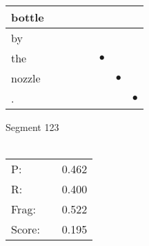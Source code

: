 \documentclass[landscape]{article}
\newcommand{\ssp}{\hspace{2pt}}
\newcommand{\mex}{\cellcolor{g}$\bullet$}
\begin{document}
\begin{tabular}{|l|p{10pt}|p{10pt}|p{10pt}|p{10pt}|p{10pt}|p{10pt}|p{10pt}|}
\hline
\ssp bottle \ssp&\hspace{2pt}&\hspace{2pt}&\hspace{2pt}&\hspace{2pt}&\hspace{2pt}&\hspace{2pt}&\hspace{2pt}\\
\hline
\ssp by \ssp&\hspace{2pt}&\hspace{2pt}&\hspace{2pt}&\hspace{2pt}&\hspace{2pt}&\hspace{2pt}&\hspace{2pt}\\
\hline
\ssp \cellcolor{ref4}the \ssp&\hspace{2pt}&\hspace{2pt}&\hspace{2pt}&\hspace{2pt}&\hspace{2pt}\mex&\hspace{2pt}&\hspace{2pt}\\
\hline
\ssp \cellcolor{ref5}nozzle \ssp&\hspace{2pt}&\hspace{2pt}&\hspace{2pt}&\hspace{2pt}&\hspace{2pt}&\hspace{2pt}\mex&\hspace{2pt}\\
\hline
\ssp \cellcolor{ref6}. \ssp&\hspace{2pt}&\hspace{2pt}&\hspace{2pt}&\hspace{2pt}&\hspace{2pt}&\hspace{2pt}&\hspace{2pt}\mex\\
\hline
\end{tabular}

\vspace{6pt}
\noindent Segment 123\\\\
\noindent\begin{tabular}{lm{12pt}r}
\hline
P:&&0.462\\
R:&&0.400\\
Frag:&&0.522\\
Score:&&0.195\\
\end{tabular}
\end{document}
